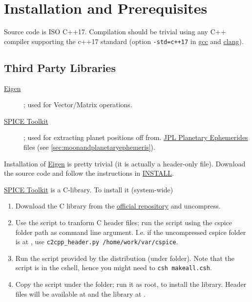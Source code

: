 \section{Installation and Prerequisites}\label{sec:installation-and-prerequisites}

Source code is ISO C++17. Compilation should be trivial using any C++ compiler
supporting the c++17 standard (option \texttt{-std=c++17} in \href{https://gcc.gnu.org/}{gcc}
and \href{https://clang.org/}{clang}).

\subsection{Third Party Libraries}\label{ssec:third-party}
\begin{description}
  \item [\href{https://eigen.tuxfamily.org/index.php?title=Main_Page}{Eigen}]; 
  used for Vector/Matrix operations.
  \item [\href{https://naif.jpl.nasa.gov/naif/toolkit.html}{SPICE Toolkit}]; 
  used for extracting planet positions off from. 
  \href{https://ssd.jpl.nasa.gov/planets/eph_export.html}{JPL Planetary Ephemerides} files 
  (see \autoref{sec:moonandplanetaryephemeris}).
\end{description}

Installation of \href{https://eigen.tuxfamily.org/index.php?title=Main_Page}{Eigen} is 
pretty trivial (it is actually a header-only file). Download the source code and follow 
the instructions in \href{https://gitlab.com/libeigen/eigen/-/blob/master/INSTALL?ref_type=heads}{INSTALL}.

\href{https://naif.jpl.nasa.gov/naif/toolkit.html}{SPICE Toolkit} is a C-library. 
To install it (system-wide)
\begin{enumerate}
  \item Download the C library from the \href{https://naif.jpl.nasa.gov/naif/toolkit_C.html}{official repository} 
    and uncompress.
  \item Use the script  to tranform 
    C header files; run the script using the cspice  folder path 
    as command line argument. I.e. if the uncompressed cspice folder is at , 
    use \texttt{c2cpp\_header.py /home/work/var/cspice}.
  \item Run the  script provided by the distribution (under 
     folder). Note that the script is in the cshell, hence you 
    might need to \texttt{csh makeall.csh}.
  \item Copy the  script under the  
    folder; run it as root, to install the library. Header files will be available at 
     and the library at .
\end{enumerate}

